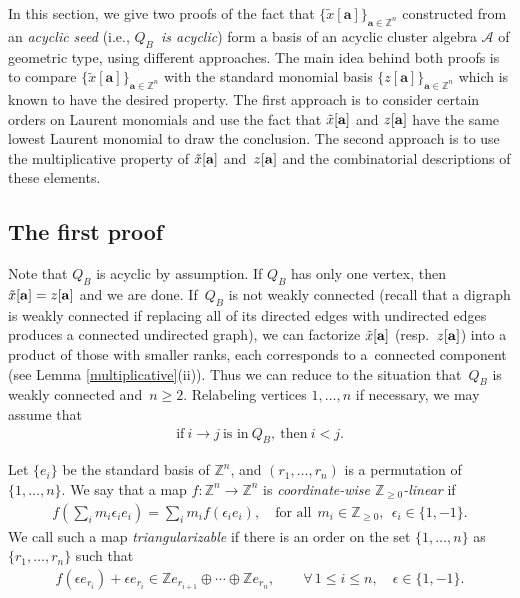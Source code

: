 \documentclass[pdftex]{sigma}
\numberwithin{equation}{section}
\begin{document}
 In this section, we give two proofs of the fact that $\{\tilde{x}[\textbf{a}]\}_{\textbf{a}\in\mathbb{Z}^n}$ constructed from an {\it acyclic seed} (i.e., {\it $Q_B$~is acyclic}) form a basis of an acyclic cluster algebra $\mathcal{A}$ of geometric type, using dif\/ferent approaches. The main idea behind both proofs is to compare $\{\tilde{x}[\textbf{a}]\}_{\textbf{a}\in\mathbb{Z}^n}$ with the standard monomial basis $\{z[\textbf{a}]\}_{\textbf{a}\in\mathbb{Z}^n}$ which is known to have the desired property.
 The f\/irst approach is to consider certain orders on Laurent monomials and use the fact that $\tilde{x}[{\bf a}]$ and $z[{\bf a}]$  have the same lowest Laurent monomial to draw the conclusion. The second approach is to use the multiplicative property of $\tilde{x}[{\bf a}]$ and~$z[{\bf a}]$ and the combinatorial descriptions of these elements.



\subsection{The f\/irst proof}\label{section6.1}

 Note that $Q_B$ is acyclic by assumption.
If $Q_B$ has only one vertex, then $\tilde{x}[{\bf a}]=z[{\bf a}]$ and we are done.
If~$Q_B$ is not weakly connected (recall that a digraph is weakly connected if replacing all of its directed edges with undirected edges produces a connected undirected graph), we can factorize $\tilde{x}[{\bf a}]$ (resp.\ $z[{\bf a}]$) into a product of those with smaller ranks, each corresponds to a~connected component (see Lemma \ref{multiplicative}(ii)). Thus we can reduce to the situation that~$Q_B$ is weakly connected and~$n\ge 2$.
Relabeling vertices $1,\dots,n$ if necessary, we may assume that
\begin{gather*}
\text{if} \ i\to j \ \text{is in} \ Q_B, \ \text{then} \ i<j.
\end{gather*}


Let $\{e_i\}$ be the standard basis of $\mathbb{Z}^n$, and $(r_1,\dots,r_n)$ is a permutation of $\{1,\dots,n\}$. We say that a map $f\colon \mathbb{Z}^n\to \mathbb{Z}^n$ is {\it coordinate-wise $\mathbb{Z}_{\ge0}$-linear} if
\begin{gather*}
f\left(\sum_i m_i\epsilon_ie_i\right)=\sum_i m_i f(\epsilon_ie_i),\quad \text{for all} \ \ m_i\in\mathbb{Z}_{\ge0},\ \  \epsilon_i\in\{1,-1\}.
\end{gather*}
We call such a map {\it triangularizable} if there is an order on the set $\{1,\dots,n\}$ as $\{r_1,\dots,r_n\}$ such that
\begin{gather*}
f(\epsilon e_{r_i})+\epsilon e_{r_i}\in \mathbb{Z}e_{r_{i+1}}\oplus\cdots \oplus\mathbb{Z}e_{r_n},\qquad \forall\, 1\le i\le n, \quad \epsilon\in\{1,-1\}.
\end{gather*}
\end{document}
